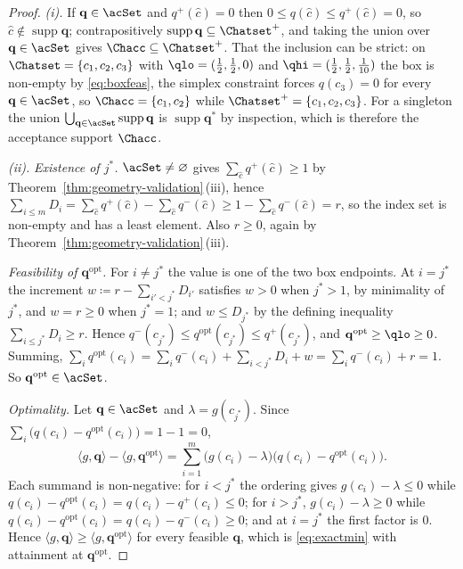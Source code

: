 \begin{proof}
\emph{(i).} If $\mathbf{q}\in\acSet$ and $q^{+}(\hat c)=0$ then
$0\le q(\hat c)\le q^{+}(\hat c)=0$, so $\hat c\notin\operatorname{supp}
\mathbf{q}$; contrapositively $\operatorname{supp}\mathbf{q}\subseteq\Chatset^{+}$,
and taking the union over $\mathbf{q}\in\acSet$ gives
$\Chacc\subseteq\Chatset^{+}$. That the inclusion can be strict: on
$\Chatset=\{c_1,c_2,c_3\}$ with $\qlo=(\tfrac12,\tfrac12,0)$ and
$\qhi=(\tfrac12,\tfrac12,\tfrac1{10})$ the box is non-empty by
\eqref{eq:boxfeas}, the simplex constraint forces $q(c_3)=0$ for every
$\mathbf{q}\in\acSet$, so $\Chacc=\{c_1,c_2\}$ while
$\Chatset^{+}=\{c_1,c_2,c_3\}$. For a singleton the union
$\bigcup_{\mathbf{q}\in\acSet}\operatorname{supp}\mathbf{q}$ is
$\operatorname{supp}\mathbf{q}^{\ast}$ by inspection, which is therefore the
acceptance support $\Chacc$.

\emph{(ii).} \emph{Existence of $j^{\ast}$.} $\acSet\neq\varnothing$ gives
$\sum_{\hat c}q^{+}(\hat c)\ge1$ by Theorem~\ref{thm:geometry-validation}\,(iii), hence
$\sum_{i\le m}D_i=\sum_{\hat c}q^{+}(\hat c)-\sum_{\hat c}q^{-}(\hat c)\ge
1-\sum_{\hat c}q^{-}(\hat c)=r$, so the index set is non-empty and has a least
element. Also $r\ge0$, again by Theorem~\ref{thm:geometry-validation}\,(iii).

\emph{Feasibility of $\mathbf{q}^{\mathrm{opt}}$.} For $i\neq j^{\ast}$ the value is
one of the two box endpoints. At $i=j^{\ast}$ the increment
$w\coloneqq r-\sum_{i'<j^{\ast}}D_{i'}$ satisfies $w>0$ when
$j^{\ast}>1$, by minimality of $j^{\ast}$, and $w=r\ge0$ when
$j^{\ast}=1$; and $w\le D_{j^{\ast}}$ by the defining inequality
$\sum_{i\le j^{\ast}}D_i\ge r$. Hence
$q^{-}(c_{j^{\ast}})\le q^{\mathrm{opt}}(c_{j^{\ast}})\le q^{+}(c_{j^{\ast}})$, and
$\mathbf{q}^{\mathrm{opt}}\ge\qlo\ge0$. Summing,
$\sum_i q^{\mathrm{opt}}(c_i)=\sum_i q^{-}(c_i)+\sum_{i<j^{\ast}}D_i+w
=\sum_i q^{-}(c_i)+r=1$. So $\mathbf{q}^{\mathrm{opt}}\in\acSet$.

\emph{Optimality.} Let $\mathbf{q}\in\acSet$ and $\lambda=g(c_{j^{\ast}})$.
Since $\sum_i\big(q(c_i)-q^{\mathrm{opt}}(c_i)\big)=1-1=0$,
\begin{equation*}
  \langle g,\mathbf{q}\rangle-\langle g,\mathbf{q}^{\mathrm{opt}}\rangle
  =\sum_{i=1}^{m}\big(g(c_i)-\lambda\big)
   \big(q(c_i)-q^{\mathrm{opt}}(c_i)\big).
\end{equation*}
Each summand is non-negative: for $i<j^{\ast}$ the ordering gives
$g(c_i)-\lambda\le0$ while $q(c_i)-q^{\mathrm{opt}}(c_i)=q(c_i)-q^{+}(c_i)\le0$; for
$i>j^{\ast}$, $g(c_i)-\lambda\ge0$ while
$q(c_i)-q^{\mathrm{opt}}(c_i)=q(c_i)-q^{-}(c_i)\ge0$; and at $i=j^{\ast}$ the first
factor is $0$. Hence
$\langle g,\mathbf{q}\rangle\ge\langle g,\mathbf{q}^{\mathrm{opt}}\rangle$ for every
feasible $\mathbf{q}$, which is \eqref{eq:exactmin} with attainment at
$\mathbf{q}^{\mathrm{opt}}$.


\end{proof}
